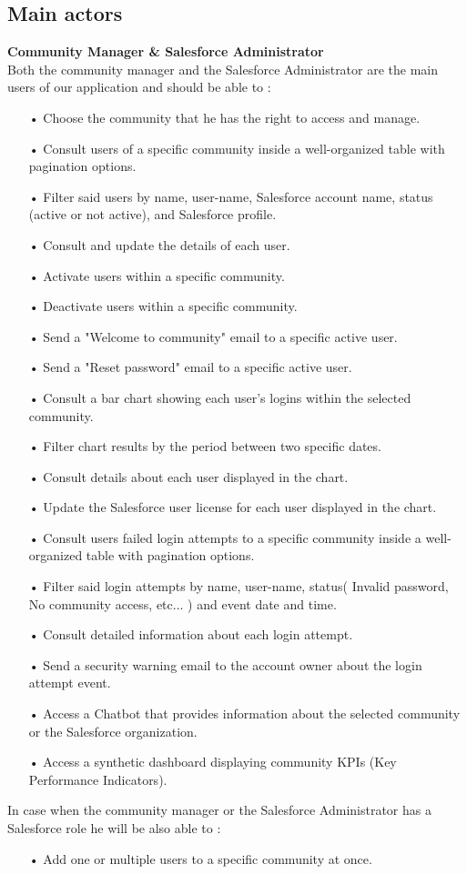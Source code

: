 \subsection*{Main actors}
\textbf{Community Manager \& Salesforce Administrator}\\
Both the community manager and the Salesforce Administrator are the main users of our application and should be able to :
\begin{itemize}
\item[•] Choose the community that he has the right to access and manage.
\item[•] Consult users of a specific community inside a well-organized table with pagination options.
\item[•] Filter said users by name, user-name, Salesforce account name, status (active or not active), and Salesforce profile.
\item[•] Consult and update the details of each user.
\item[•] Activate users within a specific community.
\item[•] Deactivate users within a specific community.
\item[•] Send a "Welcome to community" email to a specific active user.
\item[•] Send a "Reset password" email to a specific active user.
\item[•] Consult a bar chart showing each user's logins within the selected community.
\item[•] Filter chart results by the period between two specific dates.
\item[•] Consult details about each user displayed in the chart.
\item[•] Update the Salesforce user license for each user displayed in the chart.
\item[•] Consult users failed login attempts to a specific community inside a well-organized table with pagination options.
\item[•] Filter said login attempts by name, user-name, status( Invalid password, No community access, etc... ) and event date and time.
\item[•] Consult detailed information about each login attempt.
\item[•] Send a security warning email to the account owner about the login attempt event.
\item[•] Access a Chatbot that provides information about the selected community or the Salesforce organization.
\item[•] Access a synthetic dashboard displaying community KPIs (Key Performance Indicators).

\end{itemize}
In case when the community manager or the Salesforce Administrator has a Salesforce role he will be also able to :
\begin{itemize}
\item[•] Add one or multiple users to a specific community at once.
\end{itemize}

